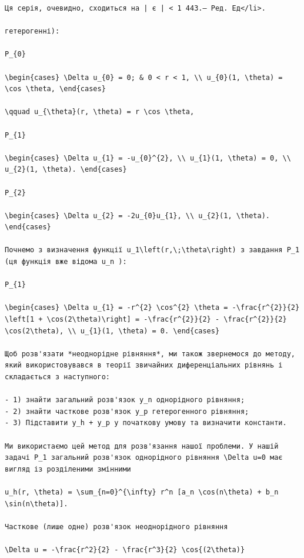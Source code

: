 \documentclass[
  ukrainian,
]{article}
\begin{document}
\begin{verbatim}
Ця серія, очевидно, сходиться на | є | < 1 443.— Ред. Ед</li>.

гетерогенні):

P_{0}

\begin{cases} \Delta u_{0} = 0; & 0 < r < 1, \\ u_{0}(1, \theta) = \cos \theta, \end{cases}

\qquad u_{\theta}(r, \theta) = r \cos \theta,

P_{1}

\begin{cases} \Delta u_{1} = -u_{0}^{2}, \\ u_{1}(1, \theta) = 0, \\ u_{2}(1, \theta). \end{cases}

P_{2}

\begin{cases} \Delta u_{2} = -2u_{0}u_{1}, \\ u_{2}(1, \theta). \end{cases}

Почнемо з визначення функції u_1\left(r,\;\theta\right) з завдання P_1 (ця функція вже відома u_n ):

P_{1}

\begin{cases} \Delta u_{1} = -r^{2} \cos^{2} \theta = -\frac{r^{2}}{2} \left[1 + \cos(2\theta)\right] = -\frac{r^{2}}{2} - \frac{r^{2}}{2} \cos(2\theta), \\ u_{1}(1, \theta) = 0. \end{cases}

Щоб розв'язати *неоднорідне рівняння*, ми також звернемося до методу, який використовувався в теорії звичайних диференціальних рівнянь і складається з наступного:

- 1) знайти загальний розв'язок y_n однорідного рівняння;
- 2) знайти часткове розв'язок y_p гетерогенного рівняння;
- 3) Підставити y_h + y_p у початкову умову та визначити константи.

Ми використаємо цей метод для розв'язання нашої проблеми. У нашій задачі P_1 загальний розв'язок однорідного рівняння \Delta u=0 має вигляд із розділеними змінними

u_h(r, \theta) = \sum_{n=0}^{\infty} r^n [a_n \cos(n\theta) + b_n \sin(n\theta)].

Часткове (лише одне) розв'язок неоднорідного рівняння

\Delta u = -\frac{r^2}{2} - \frac{r^3}{2} \cos{(2\theta)}


\end{verbatim}
\end{document}
